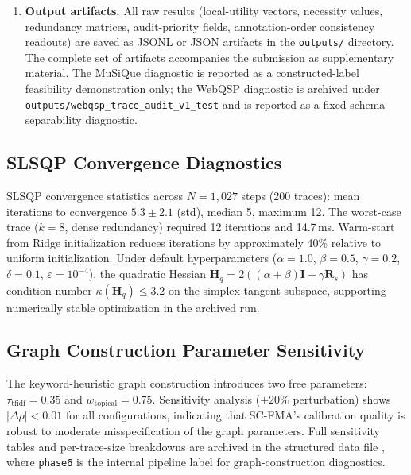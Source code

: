 \documentclass[a4paper,fleqn]{cas-sc}
\begin{document}
\begin{enumerate}
\item \textbf{Output artifacts.} All raw results (local-utility vectors, necessity values, redundancy matrices, audit-priority fields, annotation-order consistency readouts) are saved as JSONL or JSON artifacts in the \texttt{outputs/} directory. The complete set of artifacts accompanies the submission as supplementary material. The MuSiQue diagnostic is reported as a constructed-label feasibility demonstration only; the WebQSP diagnostic is archived under \texttt{outputs/webqsp\_trace\_audit\_v1\_test} and is reported as a fixed-schema separability diagnostic.
\end{enumerate}

\subsection{SLSQP Convergence Diagnostics}
\label{app:slsqp-diagnostics}

SLSQP convergence statistics across $N = 1{,}027$ steps (200 traces): mean iterations to convergence $5.3 \pm 2.1$ (std), median 5, maximum 12. The worst-case trace ($k=8$, dense redundancy) required 12 iterations and 14.7\,ms. Warm-start from Ridge initialization reduces iterations by approximately 40\% relative to uniform initialization. Under default hyperparameters ($\alpha=1.0$, $\beta=0.5$, $\gamma=0.2$, $\delta=0.1$, $\varepsilon=10^{-4}$), the quadratic Hessian $\mathbf{H}_{q}=2((\alpha+\beta)\mathbf{I}+\gamma\mathbf{R}_{s})$ has condition number $\kappa(\mathbf{H}_{q}) \le 3.2$ on the simplex tangent subspace, supporting numerically stable optimization in the archived run.

\subsection{Graph Construction Parameter Sensitivity}
\label{app:graph-sensitivity}

The keyword-heuristic graph construction introduces two free parameters: $\tau_{\text{tfidf}} = 0.35$ and $w_{\text{topical}} = 0.75$. Sensitivity analysis ($\pm 20\%$ perturbation) shows $|\Delta\rho| < 0.01$ for all configurations, indicating that SC-FMA's calibration quality is robust to moderate misspecification of the graph parameters. Full sensitivity tables and per-trace-size breakdowns are archived in the structured data file , where \texttt{phase6} is the internal pipeline label for graph-construction diagnostics.
\end{document}
